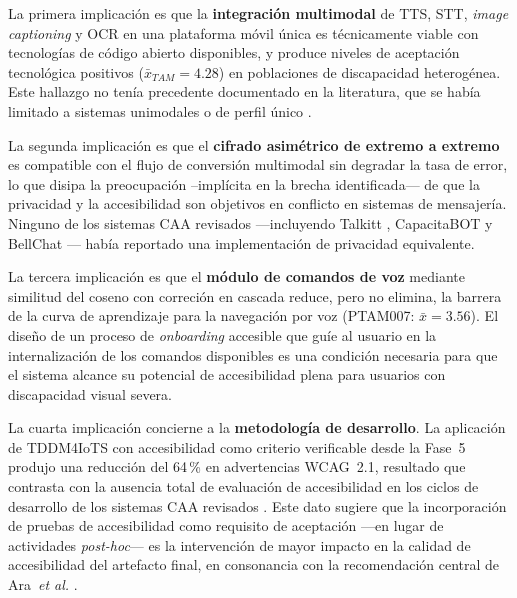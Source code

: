 \documentclass[journal]{IEEEtran}
\begin{document}
			La primera implicaci\'on es que la \textbf{integraci\'on multimodal} de TTS, STT, \textit{image captioning} y OCR en una plataforma m\'ovil \'unica es t\'ecnicamente viable con tecnolog\'ias de c\'odigo abierto disponibles, y produce niveles de aceptaci\'on tecnol\'ogica positivos ($\bar{x}_{TAM}=4.28$) en poblaciones de discapacidad heterog\'enea. Este hallazgo no ten\'ia precedente documentado en la literatura, que se hab\'ia limitado a sistemas unimodales \cite{guerrero2021bellchat} o de perfil \'unico \cite{stefanov2024, yeratziotis2023}.
			
			La segunda implicaci\'on es que el \textbf{cifrado asim\'etrico de extremo a extremo} es compatible con el flujo de conversi\'on multimodal sin degradar la tasa de error, lo que disipa la preocupaci\'on --impl\'icita en la brecha identificada--- de que la privacidad y la accesibilidad son objetivos en conflicto en sistemas de mensajer\'ia. Ninguno de los sistemas CAA revisados ---incluyendo Talkitt \cite{costanzo2023}, CapacitaBOT \cite{mateos2022} y BellChat \cite{guerrero2021bellchat}--- hab\'ia reportado una implementaci\'on de privacidad equivalente.
			
			La tercera implicaci\'on es que el \textbf{m\'odulo de comandos de voz} mediante similitud del coseno con correci\'on en cascada reduce, pero no elimina, la barrera de la curva de aprendizaje para la navegaci\'on por voz (PTAM007: $\bar{x}=3.56$). El dise\~no de un proceso de \textit{onboarding} accesible que guíe al usuario en la internalizaci\'on de los comandos disponibles es una condici\'on necesaria para que el sistema alcance su potencial de accesibilidad plena para usuarios con discapacidad visual severa.
			
			La cuarta implicaci\'on concierne a la \textbf{metodolog\'ia de desarrollo}. La aplicaci\'on de TDDM4IoTS \cite{guerrero2020} con accesibilidad como criterio verificable desde la Fase~5 produjo una reducci\'on del 64\,\% en advertencias WCAG~2.1, resultado que contrasta con la ausencia total de evaluaci\'on de accesibilidad en los ciclos de desarrollo de los sistemas CAA revisados \cite{costanzo2023, mateos2022, janaka2023}. Este dato sugiere que la incorporaci\'on de pruebas de accesibilidad como requisito de aceptaci\'on ---en lugar de actividades \textit{post-hoc}--- es la intervenci\'on de mayor impacto en la calidad de accesibilidad del artefacto final, en consonancia con la recomendaci\'on central de Ara~\textit{et al.} \cite{ara2024}.
			
\end{document}
